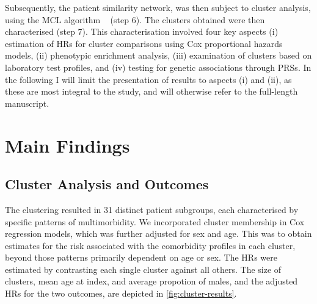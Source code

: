 Subsequently,
the patient similarity network,
was then subject to cluster analysis,
using the \ac{MCL} algorithm 
~\autocite{vandongenGraph2008}
(step 6). 
The clusters obtained were then characterised (step 7).
This characterisation involved four key aspects 
(i) estimation of \acp{HR} for cluster comparisons using Cox proportional hazards models,
(ii) phenotypic enrichment analysis, 
(iii) examination of clusters based on laboratory test profiles,
and (iv) testing for genetic associations through \acp{PRS}.
In the following I will limit the presentation
of results to aspects (i) and (ii), 
as these are most integral to the study,
and will otherwise refer to the full-length manuscript.

\section{Main Findings}

% 

\subsection{Cluster Analysis and Outcomes}


The clustering resulted in 31 distinct patient subgroups, 
each characterised by specific patterns of multimorbidity.
We incorporated cluster membership in Cox regression models, 
which was further adjusted for sex and age. 
This was to obtain estimates for the risk associated with the comorbidity
profiles in each cluster, beyond those patterns primarily dependent on
age or sex.
The \acp{HR} were estimated 
by contrasting each single cluster against all others.
The size of clusters, mean age at index, and average propotion of males, 
and the adjusted \acp{HR} for the two outcomes, are
depicted in \cref{fig:cluster-results}.

